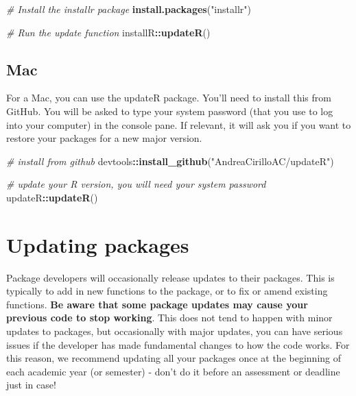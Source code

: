 \documentclass[
  oneside]{book}
\newenvironment{Shaded}{\begin{snugshade}}{\end{snugshade}}
\newcommand{\CommentTok}[1]{\textcolor[rgb]{0.56,0.35,0.01}{\textit{#1}}}
\newcommand{\FunctionTok}[1]{\textcolor[rgb]{0.13,0.29,0.53}{\textbf{#1}}}
\newcommand{\NormalTok}[1]{#1}
\newcommand{\SpecialCharTok}[1]{\textcolor[rgb]{0.81,0.36,0.00}{\textbf{#1}}}
\newcommand{\StringTok}[1]{\textcolor[rgb]{0.31,0.60,0.02}{#1}}
\begin{document}
\begin{Shaded}
\begin{Highlighting}[]
\CommentTok{\# Install the installr package}
\FunctionTok{install.packages}\NormalTok{(}\StringTok{"installr"}\NormalTok{)}

\CommentTok{\# Run the update function}
\NormalTok{installR}\SpecialCharTok{::}\FunctionTok{updateR}\NormalTok{()}
\end{Highlighting}
\end{Shaded}

\hypertarget{mac}{%
\subsection{Mac}\label{mac}}

For a Mac, you can use the updateR package. You'll need to install this from GitHub. You will be asked to type your system password (that you use to log into your computer) in the console pane. If relevant, it will ask you if you want to restore your packages for a new major version.

\begin{Shaded}
\begin{Highlighting}[]
\CommentTok{\# install from github}
\NormalTok{devtools}\SpecialCharTok{::}\FunctionTok{install\_github}\NormalTok{(}\StringTok{"AndreaCirilloAC/updateR"}\NormalTok{)}

\CommentTok{\# update your R version, you will need your system password}
\NormalTok{updateR}\SpecialCharTok{::}\FunctionTok{updateR}\NormalTok{()}
\end{Highlighting}
\end{Shaded}

\hypertarget{updating-packages}{%
\section{Updating packages}\label{updating-packages}}

Package developers will occasionally release updates to their packages. This is typically to add in new functions to the package, or to fix or amend existing functions. \textbf{Be aware that some package updates may cause your previous code to stop working}. This does not tend to happen with minor updates to packages, but occasionally with major updates, you can have serious issues if the developer has made fundamental changes to how the code works. For this reason, we recommend updating all your packages once at the beginning of each academic year (or semester) - don't do it before an assessment or deadline just in case!
\end{document}
